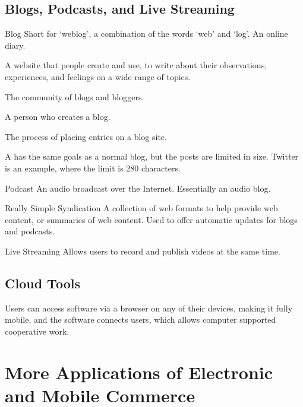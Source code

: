 \documentclass[\main/notes.tex]{subfiles}
\begin{document}
			\subsection{Blogs, Podcasts, and Live Streaming}
				\begin{definition}{Blog}
					Short for `weblog', a combination of the words `web' and `log'. An online diary.

					A website that people create and use, to write about their observations, experiences, and feelings on a wide range of topics.
					\begin{description}[nosep]
						\item[Blogosphere] The community of blogs and bloggers.
						\item[Blogger] A person who creates a blog.
						\item[Blogging] The process of placing entries on a blog site.
					\end{description}

					A  has the same goals as a normal blog, but the posts are limited in size. Twitter is an example, where the limit is 280 characters.
				\end{definition}
				\begin{definition}{Podcast}
					An audio broadcast over the Internet. Essentially an audio blog.
				\end{definition}
				\begin{definition}{Really Simple Syndication}
					A collection of web formats to help provide web content, or summaries of web content. Used to offer automatic updates for blogs and podcasts.
				\end{definition}
				\begin{definition}{Live Streaming}
					Allows users to record and publish videos at the same time.
				\end{definition}
			\subsection{Cloud Tools}
				Users can access software via a browser on any of their devices, making it fully mobile, and the software connects users, which allows computer supported cooperative work.

		\section[More Applications of E-Commerce and m-Commerce]{More Applications of Electronic and Mobile Commerce}
\end{document}
